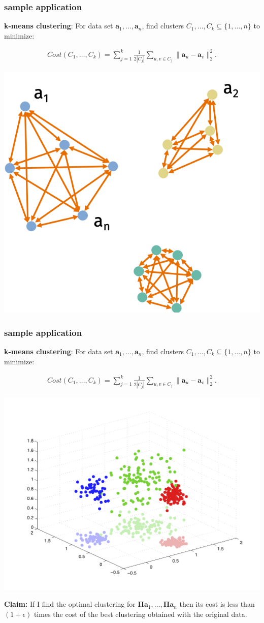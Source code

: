 \documentclass[compress]{beamer}
\newcommand{\bs}[1]{\boldsymbol{#1}}
\newcommand{\bv}[1]{\mathbf{#1}}
\begin{document}
\begin{frame}[t]
	\frametitle{sample application}
	\textbf{k-means clustering}: For data set $\bv{a}_1, \ldots, \bv{a}_n$,  find clusters $C_1, \ldots, C_k \subseteq \{1, \ldots, n\}$ to minimize:
	\vspace{-2em}
	
	\begin{align*}
		Cost(C_1,\ldots, C_k) = \sum_{j=1}^k \frac{1}{2|C_j|}\sum_{u,v\in C_j} \|\bv{a}_u - \bv{a}_v\|_2^2.
	\end{align*}
	
	\vspace{-2em}
	\begin{center}
		\includegraphics[width=.5\textwidth]{kmeans4.png}
	\end{center}
\end{frame}

\begin{frame}[t]
	\frametitle{sample application}
	\textbf{k-means clustering}: For data set $\bv{a}_1, \ldots, \bv{a}_n$,  find clusters $C_1, \ldots, C_k \subseteq \{1, \ldots, n\}$ to minimize:
	\vspace{-2em}
	
	\begin{align*}
		Cost(C_1,\ldots, C_k) = \sum_{j=1}^k \frac{1}{2|C_j|}\sum_{u,v\in C_j} \|\bv{a}_u - \bv{a}_v\|_2^2.
	\end{align*}
	
	\vspace{-2em}
	\begin{center}
		\vspace{-.5em}
		\includegraphics[width=.5\textwidth]{clustering_projected.png}
		\vspace{-.5em}
	\end{center}
	\textbf{Claim:} If I find the optimal clustering for $\bs{\Pi}\bv{a}_1, \ldots, \bs{\Pi}\bv{a}_n$ then its cost is less than $(1+\epsilon)$ times the cost of the best clustering obtained with the original data. 
\end{frame}
\end{document}
